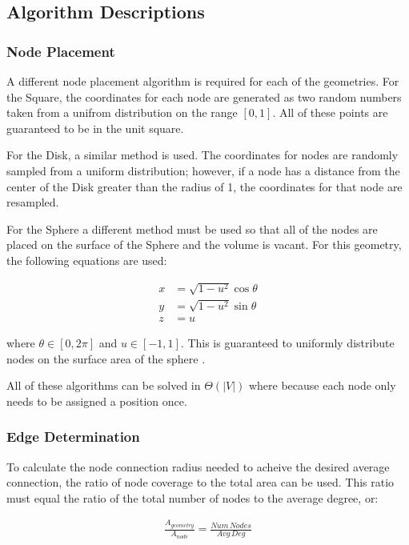 \documentclass{article}
\begin{document}
    \subsection{Algorithm Descriptions}

        \subsubsection{Node Placement}
        A different node placement algorithm is required for each of the geometries. For the Square, the coordinates for each node are generated as two random numbers taken from a unifrom distribution on the range $[0,1]$. All of these points are guaranteed to be in the unit square.
        \par
        For the Disk, a similar method is used. The coordinates for nodes are randomly sampled from a uniform distribution; however, if a node has a distance from the center of the Disk greater than the radius of 1, the coordinates for that node are resampled.
        \par
        For the Sphere a different method must be used so that all of the nodes are placed on the surface of the Sphere and the volume is vacant. For this geometry, the following equations are used:

        \begin{align}
            x &= \sqrt{1-u^2}\cos\theta \\
            y &= \sqrt{1-u^2}\sin\theta \\
            z &= u
        \end{align}

        where $\theta \in [0,2\pi]$ and $u \in [-1,1]$. This is guaranteed to uniformly distribute nodes on the surface area of the sphere \cite{spherepoints}.
        \par
        All of these algorithms can be solved in $\Theta\left(|V|\right)$ where because each node only needs to be assigned a position once.

        \subsubsection{Edge Determination}
        To calculate the node connection radius needed to acheive the desired average connection, the ratio of node coverage to the total area can be used. This ratio must equal the ratio of the total number of nodes to the average degree, or:

        \begin{align}
            \frac{A_{geometry}}{A_{node}}= \frac{Num\,Nodes}{Avg\,Deg}
        \end{align}
\end{document}

